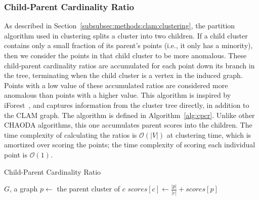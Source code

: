 \subsubsection{Child-Parent Cardinality Ratio}
\label{subsubsec:methods:individual-algorithms:cpcr}
As described in Section~\ref{subsubsec:methods:clam:clustering}, the partition algorithm used in clustering splits a cluster into two children.
If a child cluster contains only a small fraction of its parent's points (i.e., it only has a minority), then we consider the points in that child cluster to be more anomalous.
These child-parent cardinality ratios are accumulated for each point down its branch in the tree, terminating when the child cluster is a vertex in the induced graph.
Points with a low value of these accumulated ratios are considered more anomalous than points with a higher value.
This algorithm is inspired by iForest~\cite{tony2008iforest}, and captures information from the cluster tree directly, in addition to the CLAM graph.
The algorithm is defined in Algorithm~\ref{alg:cpcr}.
Unlike other CHAODA algorithms, this one accumulates parent scores into the children.
The time complexity of calculating the ratios is $\mathcal{O}(|V|)$ at clustering time, which is amortized over scoring the points;
the time complexity of scoring each individual point is $\mathcal{O}(1)$.

\begin{algorithm}[h]
    \caption{Child-Parent Cardinality Ratio}
    \label{alg:cpcr}
\begin{algorithmic}[1]
    \REQUIRE $G$, a graph
        \STATE $p \gets$ the parent cluster of $c$
        \STATE $scores[c] \gets \frac{|p|}{|c|} + scores[p]$
    \ENDFOR
\end{algorithmic}
\end{algorithm}


